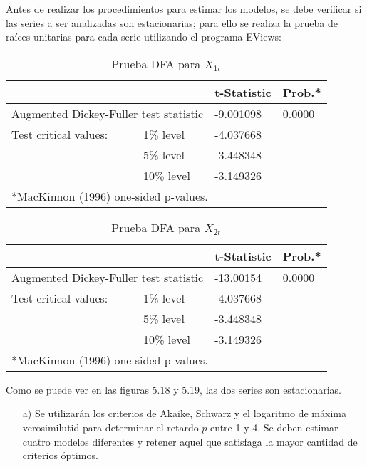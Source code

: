 \begin{enumerate}
Antes de realizar los procedimientos para estimar los modelos, se debe verificar si las series a ser analizadas son estacionarias; para ello se realiza la prueba de ra\'{i}ces unitarias para cada serie utilizando el programa EViews:

\begin{table}[H]
\centering
\begin{tabular}{p{120pt}p{60pt}p{50pt}l} \hline \hline
& & t-Statistic & Prob.* \\ \hline \hline
\multicolumn{2}{p{180pt}}{Augmented Dickey-Fuller test statistic} & -9.001098 & 0.0000 \\ \hline
Test critical values: & 1{\%} level & -4.037668 & \\ 
 & 5{\%} level & -3.448348 & \\ 
 & 10{\%} level & -3.149326 & \\ \hline \hline
\multicolumn{4}{l}{*MacKinnon (1996) one-sided p-values.} \\
\end{tabular}
\caption{Prueba DFA para $X_{1t}$}
\label{tab33}
\end{table}

\begin{table}[H]
\centering
\begin{tabular}{p{120pt}p{60pt}p{50pt}l} \hline \hline
& & t-Statistic & Prob.* \\ \hline \hline
\multicolumn{2}{p{180pt}}{Augmented Dickey-Fuller test statistic} & -13.00154 & 0.0000 \\ \hline
Test critical values: & 1{\%} level & -4.037668 & \\ 
 & 5{\%} level & -3.448348 & \\ 
 & 10{\%} level & -3.149326 & \\ \hline \hline
\multicolumn{4}{l}{*MacKinnon (1996) one-sided p-values.} \\
\end{tabular}
\caption{Prueba DFA para $X_{2t}$}
\label{tab34}
\end{table}

Como se puede ver en las figuras 5.18 y 5.19, las dos series son estacionarias.
\begin{enumerate}
      \item[a)] Se utilizar\'{a}n los criterios de Akaike, Schwarz y el logaritmo de m\'{a}xima verosimilutid para determinar el retardo $p$ entre 1 y 4. Se deben estimar cuatro modelos diferentes y retener aquel que satisfaga la mayor cantidad de criterios \'{o}ptimos.
\end{enumerate}


\end{enumerate}
